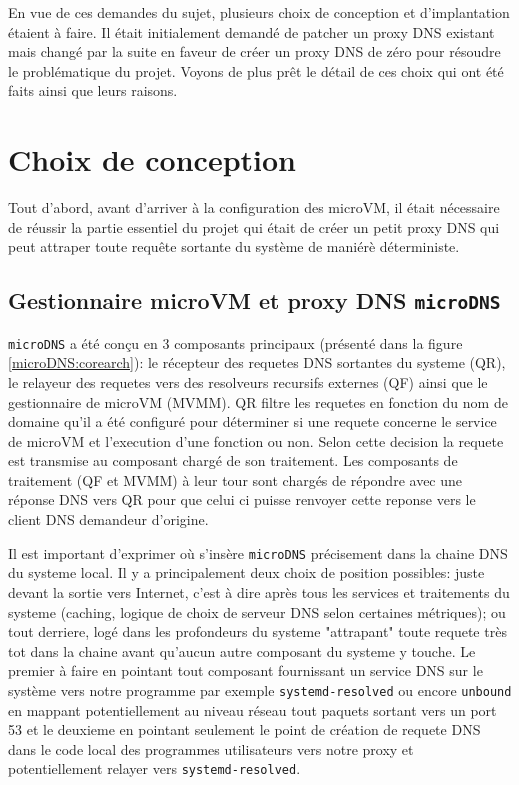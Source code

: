 \documentclass[12pt]{article}
\begin{document}
En vue de ces demandes du sujet, plusieurs choix de conception et d'implantation étaient à faire. Il était initialement demandé de patcher un proxy DNS existant mais changé par la suite en faveur de créer un proxy DNS de zéro pour résoudre le problématique du projet. Voyons de plus prêt le détail de ces choix qui ont été faits ainsi que leurs raisons.

\section{Choix de conception}
Tout d'abord, avant d'arriver à la configuration des microVM, il était nécessaire de réussir la partie essentiel du projet qui était de créer un petit proxy DNS qui peut attraper toute requête sortante du système de maniérè déterministe.

\subsection{Gestionnaire microVM et proxy DNS \texttt{microDNS}}
\texttt{microDNS} a été conçu en 3 composants principaux (présenté dans la figure \ref{microDNS:corearch}): le récepteur des requetes DNS sortantes du systeme (QR), le relayeur des requetes vers des resolveurs recursifs externes (QF) ainsi que le gestionnaire de microVM (MVMM). QR filtre les requetes en fonction du nom de domaine qu'il a été configuré pour déterminer si une requete concerne le service de microVM et l'execution d'une fonction ou non. Selon cette decision la requete est transmise au composant chargé de son traitement. Les composants de traitement (QF et MVMM) à leur tour sont chargés de répondre avec une réponse DNS vers QR pour que celui ci puisse renvoyer cette reponse vers le client DNS demandeur d'origine.

Il est important d'exprimer où s'insère \texttt{microDNS} précisement dans la chaine DNS du systeme local. Il y a principalement deux choix de position possibles: juste devant la sortie vers Internet, c'est à dire après tous les services et traitements du systeme (caching, logique de choix de serveur DNS selon certaines métriques); ou tout derriere, logé dans les profondeurs du systeme "attrapant" toute requete très tot dans la chaine avant qu'aucun autre composant du systeme y touche. Le premier à faire en pointant tout composant fournissant un service DNS sur le système vers notre programme par exemple \texttt{systemd-resolved} ou encore \texttt{unbound} en mappant potentiellement au niveau réseau tout paquets sortant vers un port 53 et le deuxieme en pointant seulement le point de création de requete DNS dans le code local des programmes utilisateurs vers notre proxy et potentiellement relayer vers \texttt{systemd-resolved}.
\end{document}
